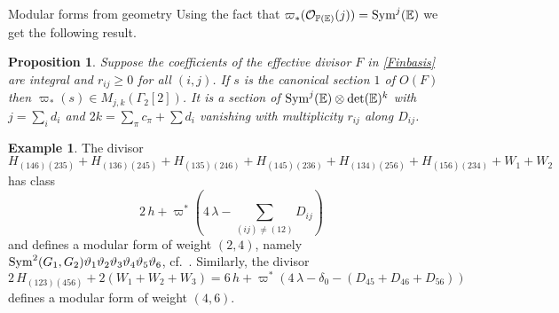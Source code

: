 \documentclass[12pt]{amsart}
\numberwithin{equation}{section}
\newcommand{\EE}{\mathbb E}
\newcommand{\PP}{\mathbb P}
\def\geq{\geqslant}
\numberwithin{equation}{section}
\newtheorem{proposition}[theorem]{Proposition}
\theoremstyle{definition}
\newtheorem{example}[theorem]{Example}
\theoremstyle{remark}
\begin{document}
\begin{section}{Modular forms from geometry}
Using the fact that $\varpi_*(\mathcal{O}_{{\PP}({\EE})}(j))={\rm Sym}^j({\EE})$ we get the following result.
\begin{proposition}
Suppose the coefficients of the effective divisor $F$ in \ref{Finbasis} are integral and $r_{ij}\geq 0$ for all $(i,j)$. 
If  $s$ is the canonical section $1$ of $O(F)$ then $\varpi_*(s)\in M_{j,k}(\Gamma_2[2])$.
It is a section of ${\rm Sym}^j({\EE})\otimes \det({\EE})^k$
with $j=\sum_i d_i$ and $2 k=\sum_{\pi} c_{\pi}+\sum d_i$ vanishing with multiplicity $r_{ij}$
along $D_{ij}$.
\end{proposition}
\begin{example}
The divisor
$$
H_{(146)(235)}+H_{(136)(245)}+H_{(135)(246)}+H_{(145)(236)}+H_{(134)(256)}+H_{(156)(234)} 
+ W_1+W_2
$$
has class 
$$
2\, h +\varpi^*(4\, \lambda -\sum_{(ij)\neq (12)} D_{ij})
$$
and defines a modular form of weight $(2,4)$, namely ${\rm Sym}^2(G_1,G_2)\vartheta_1\vartheta_2\vartheta_3\vartheta_4\vartheta_5\vartheta_6$, 
cf.\ \cite[Example 16.2]{CvdGG}.
Similarly, the divisor
$$
2\, H_{(123)(456)}+ 2(W_1+W_2+W_3)=6\, h + \varpi^*(4\, \lambda -\delta_0- (D_{45}+D_{46}+D_{56}))
$$
defines a modular form of weight $(4,6)$. 
\end{example}

\end{section}
\end{document}
